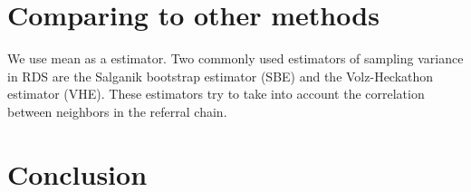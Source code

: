 \documentclass[12pt]{report}
\begin{document}
\chapter{Comparing to other methods}

We use mean as a estimator.
Two commonly used estimators of sampling variance in RDS are the Salganik bootstrap estimator (SBE) and the Volz-Heckathon estimator (VHE). These estimators try to take into account the correlation between neighbors in the referral chain.

\chapter{Conclusion}




\end{document}
